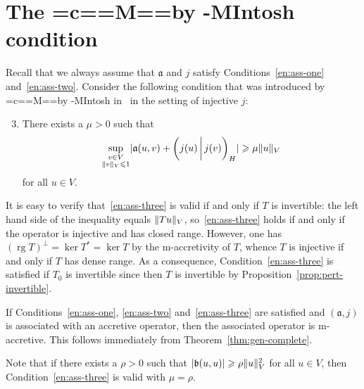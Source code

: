 \documentclass[a4paper,oneside,12pt]{amsart}
\theoremstyle{plain}
\theoremstyle{definition}
\let\le=\leqslant
\let\ge=\geqslant
\DeclarePairedDelimiter\norm{\lVert}{\rVert}
\DeclarePairedDelimiter\abs{\lvert}{\rvert}
\DeclareRobustCommand{\Mc}{\setbox0=\hbox{c}\mycheight=\ht0\setbox0=\hbox{M}\myMheight=\ht0\mycshift=\myMheight\advance\mycshift by -\mycheight\mbox{M\raisebox{\mycshift}{c}I}}
\DeclareRobustCommand{\McIntosh}{{\Mc}ntosh\xspace}
\begin{document}
\section{The \texorpdfstring{\McIntosh}{McIntosh} condition}\label{sec:mcintosh-cond}

Recall that we always assume that ${{\mathfrak{{a}}}}$ and $j$ satisfy Conditions~\ref{en:ass-one} and~\ref{en:ass-two}.
Consider the following condition that was introduced by \McIntosh in~\cite{McIntosh1968:repres} in the setting of injective $j$:
\begin{enumerate}[\upshape (I)]
\setcounter{enumi}{2}
\item\label{en:ass-three} There exists a $\mu>0$ such that
\[
    \sup_{\substack{v\in V\\\norm{v}_V\le 1}}\abs{{{\mathfrak{{a}}}}(u,v)+{{\ifthenelse{\equal{auto}{auto}}{\left({j(u)}\mkern3mu{\biggm|}\mkern3mu {j(v)}\right)}{}
\ifthenelse{\equal{auto}{b}}{\bigl({j(u)}\mkern3mu{\biggm|}\mkern3mu {j(v)}\bigr)}{}
\ifthenelse{\equal{auto}{B}}{\Bigl({j(u)}\mkern3mu{\bigm|}\mkern3mu {j(v)}\Bigr)}{}
}}_H}\ge \mu\norm{u}_V
\]
for all $u\in V$.
\end{enumerate}
It is easy to verify that~\ref{en:ass-three} is valid if and only if $T$ is invertible:
the left hand side of the inequality equals $\norm{Tu}_V$, so~\ref{en:ass-three} holds if and only
if the operator is injective and has closed range.
However, one has $(\operatorname{rg} T)^\perp=\ker T^*=\ker T$ by the {\ensuremath{\text{m}}}-accretivity of $T$, whence $T$ 
is injective if and only if $T$ has dense range.
As a consequence, Condition~\ref{en:ass-three} is satisfied if $T_0$ is invertible
since then $T$ is invertible by Proposition~\ref{prop:pert-invertible}.

If Conditions~\ref{en:ass-one}, \ref{en:ass-two} and~\ref{en:ass-three} are satisfied and $({{\mathfrak{{a}}}},j)$ is 
associated with an accretive operator, then the associated operator is {\ensuremath{\text{m}}}-accretive.
This follows immediately from Theorem~\ref{thm:gen-complete}.

Note that if there exists a $\rho>0$ such that $\abs{{{\mathfrak{{b}}}}(u,u)}\ge\rho\norm{u}_V^2$ for all $u\in V$, then Condition~\ref{en:ass-three} is valid with $\mu=\rho$.
\end{document}
